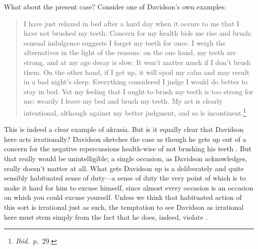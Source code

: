 \documentclass[11pt,letterpaper,oneside]{amsart}
\begin{document}




What about the present case? Consider one of Davidson's own examples:\begin{quote}I have just relaxed in bed after a hard day when it occurs to me that I have not brushed my teeth. Concern for my health bids me rise and brush; sensual indulgence suggests I forget my teeth for once. I weigh the alternatives in the light of the reasons: on the one hand, my teeth are strong, and at my age decay is slow. It won't matter much if I don't brush them. On the other hand, if I get up, it will spoil my calm and may result in a bad night's sleep. Everything considered I judge I would do better to stay in bed. Yet my feeling that I ought to brush my teeth is too strong for me: wearily I leave my bed and brush my teeth. My act is clearly intentional, although against my better judgment, and so is incontinent.\footnote{\emph{Ibid.}\ p.\ 29.}\end{quote} This is indeed a clear example of akrasia. But is it equally clear that Davidson here acts irrationally? Davidson sketches the case as though he gets up out of a concern for the negative repercussions health-wise of not brushing his teeth . But that really would be unintelligible; a single occasion, as Davidson acknowledges, really doesn't matter at all. What gets Davidson up is a deliberately and quite sensibly habituated sense of duty---a sense of duty the very point of which is to make it hard for him to excuse himself, since almost every occasion is an occasion on which you could excuse yourself. Unless we think that habituated action of this sort is irrational just as such, the temptation to see Davidson as irrational here must stem simply from the fact that he does, indeed, violate \enk.










\end{document}
